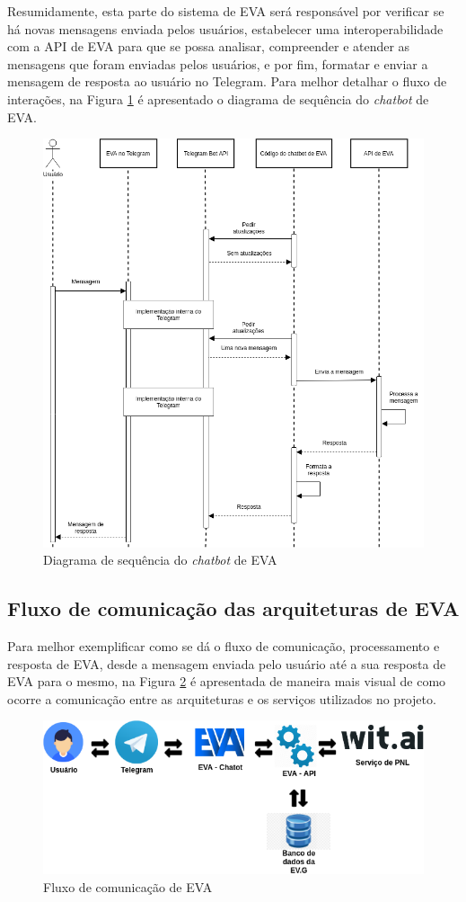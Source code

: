 Resumidamente, esta parte do sistema de EVA será responsável por verificar se há novas mensagens enviada pelos usuários, estabelecer uma interoperabilidade com a API de EVA para que se possa analisar, compreender e atender as mensagens que foram enviadas pelos usuários, e por fim, formatar e enviar a mensagem de resposta ao usuário no Telegram. Para melhor detalhar o fluxo de interações, na Figura \ref{cap:03:fig:diagrama-sequencia-2} é apresentado o diagrama de sequência do \textit{chatbot} de EVA.

\begin{figure}
  \caption{
    \label{cap:03:fig:diagrama-sequencia-2}
    Diagrama de sequência do \textit{chatbot} de EVA
  }
  \includegraphics[width=0.5\linewidth]{imagens/EVACHATBOTSEQUENCE.png}
  \mfonte
\end{figure}

\subsection{Fluxo de comunicação das arquiteturas de EVA}

Para melhor exemplificar como se dá o fluxo de comunicação, processamento e resposta de EVA, desde a mensagem enviada pelo usuário até a sua resposta de EVA para o mesmo, na Figura \ref{cap:03:fig:processamento} é apresentada de maneira mais visual de como ocorre a comunicação entre as arquiteturas e os serviços utilizados no projeto.

\begin{figure}
  \caption{
    \label{cap:03:fig:processamento}
    Fluxo de comunicação de EVA
  }
  \includegraphics[width=0.8\linewidth]{imagens/EVADiagramComplete.png}
  \mfonte
\end{figure}

